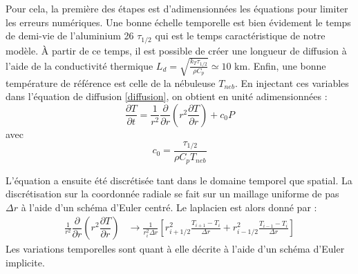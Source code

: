 \documentclass[10pt,a4paper]{article}
\numberwithin{equation}{section}
\begin{document}
Pour cela, la première des étapes est d'adimensionnées les équations pour limiter les erreurs numériques. Une bonne échelle temporelle est bien évidement le temps de demi-vie de l'aluminium 26 $\tau_{1/2}$ qui est le temps caractéristique de notre modèle. \`A partir de ce temps, il est possible de créer une longueur de diffusion à l'aide de la conductivité thermique $L_d = \sqrt{\frac{k_T \tau_{1/2}}{\rho C_p} } \simeq 10$ km. Enfin, une bonne température de référence est celle de la nébuleuse $T_{neb}$.
En injectant ces variables dans l'équation de diffusion \ref{diffusion}, on obtient en unité adimensionnées :
\begin{equation}
\dfrac{\partial T}{\partial t} = \frac{1}{r^2} \dfrac{\partial }{\partial r}\left( r^2 \dfrac{\partial T}{\partial r} \right) + c_0P
\label{diffusion_adim}
\end{equation}
avec 
\begin{equation}
c_0 = \frac{\tau_{1/2}}{\rho C_p T_{neb}}
\end{equation}

L'équation a ensuite été discrétisée tant dans le domaine temporel que spatial. La discrétisation sur la coordonnée radiale se fait sur un maillage uniforme de pas $\Delta r$ à l'aide d'un schéma d'Euler centré. Le laplacien est alors donné par :
\begin{align}
\frac{1}{r^2} \dfrac{\partial }{\partial r}\left( r^2 \dfrac{\partial T}{\partial r} \right) &\rightarrow \frac{1}{r^2_i \Delta r}\left[ r^2_{i+1/2}\frac{T_{i+1} - T_{i}}{\Delta r} + r^2_{i-1/2}\frac{T_{i-1} - T_{i}}{\Delta r} \right]
\end{align}
Les variations temporelles sont quant à elle décrite à l'aide d'un schéma d'Euler implicite.
\medskip
\end{document}
